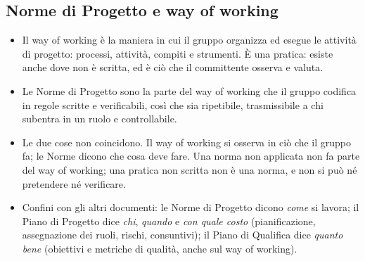 \documentclass[a4paper, 11pt]{article}
\begin{document}
\subsection{Norme di Progetto e way of working}
\begin{itemize}
    \item Il way of working è la maniera in cui il gruppo organizza ed esegue le attività di progetto: processi, attività, compiti e strumenti. È una pratica: esiste anche dove non è scritta, ed è ciò che il committente osserva e valuta.
    \item Le Norme di Progetto sono la parte del way of working che il gruppo codifica in regole scritte e verificabili, così che sia ripetibile, trasmissibile a chi subentra in un ruolo e controllabile.
    \item Le due cose non coincidono. Il way of working si osserva in ciò che il gruppo fa; le Norme dicono che cosa deve fare. Una norma non applicata non fa parte del way of working; una pratica non scritta non è una norma, e non si può né pretendere né verificare.
    \item Confini con gli altri documenti: le Norme di Progetto dicono \emph{come} si lavora; il Piano di Progetto dice \emph{chi}, \emph{quando} e \emph{con quale costo} (pianificazione, assegnazione dei ruoli, rischi, consuntivi); il Piano di Qualifica dice \emph{quanto bene} (obiettivi e metriche di qualità, anche sul way of working).
\end{itemize}
\end{document}
